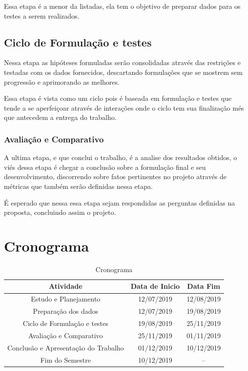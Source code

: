 Essa etapa é a menor da listadas, ela tem o objetivo de preparar dados para os testes a serem realizados.

\subsection{Ciclo de Formulação e testes}
    
Nessa etapa as hipóteses formuladas serão consolidadas através das restrições e testadas com os dados fornecidos, descartando formulações que se mostrem sem progressão e aprimorando as melhores.

Essa etapa é vista como um ciclo pois é baseada em formulação e testes que tende a se aperfeiçoar através de interações onde o ciclo tem sua finalização més que antecedem a entrega do trabalho.
    
\subsubsection{Avaliação e Comparativo}

A ultima etapa, e que conclui o trabalho, é a analise dos resultados obtidos, o viés dessa etapa é chegar a conclusão sobre a formulação final e seu desenvolvimento, discorrendo sobre fatos pertinentes no projeto através de métricas que também serão definidas nessa etapa.

É esperado que nessa essa etapa sejam respondidas as perguntas definidas na proposta, concluindo assim o projeto.


\section[Cronograma]{Cronograma}
\begin{table}[!htb]
    \centering
    \caption{Cronograma}
    \begin{tabular}{ |c|c|c| } 
        \hline
        Atividade & Data de Inicio & Data Fim\\
        \hline
        Estudo e Planejamento & 12/07/2019 & 12/08/2019  \\
        Preparação dos dados & 12/07/2019 & 19/08/2019  \\
        Ciclo de Formulação e testes & 19/08/2019 & 25/11/2019 \\
        Avaliação e Comparativo & 25/11/2019 & 01/11/2019 \\
        Conclusão e Apresentação do Trabalho & 01/12/2019 & 10/12/2019  \\
        Fim do Semestre & 10/12/2019 & --  \\ 
        \hline
    \end{tabular}
\end{table}
